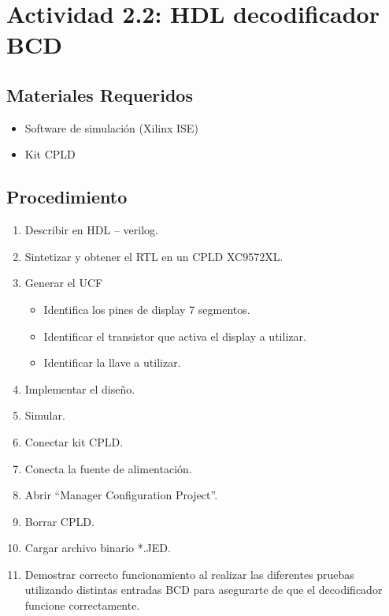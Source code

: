 \newpage
\section{Actividad 2.2: HDL decodificador BCD}

\subsection{Materiales Requeridos}
\begin{itemize}
    \item Software de simulación (Xilinx ISE)
    \item Kit CPLD
\end{itemize}

\subsection{Procedimiento}

\begin{enumerate}
    \item Describir en HDL – verilog.
    \item Sintetizar y obtener el RTL en un CPLD XC9572XL.
    \item Generar el UCF
    \begin{itemize}
        \item Identifica los pines de display 7 segmentos.
        \item Identificar el transistor que activa el display a utilizar.
        \item Identificar la llave a utilizar.
    \end{itemize}
    \setlength\itemsep{0.1em} %
    \item Implementar el diseño.
    \item Simular.
    \item Conectar kit CPLD.
    \item Conecta la fuente de alimentación.
    \item Abrir “Manager Configuration Project”.
    \item Borrar CPLD.
    \item Cargar archivo binario *.JED.
    \item Demostrar correcto funcionamiento al realizar las diferentes pruebas utilizando distintas entradas BCD para asegurarte de que el decodificador funcione correctamente.
\end{enumerate}
